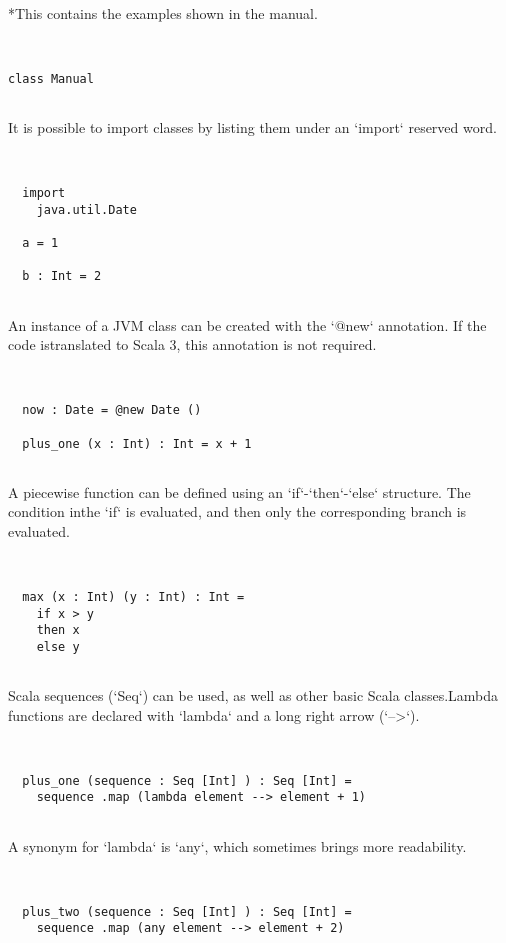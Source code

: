 \documentclass[12pt,a4paper]{article}
\begin{document}
  *This contains the examples shown in the manual.


\begin{lstlisting}


class Manual


\end{lstlisting}

It is possible to import classes by listing them under an `import` reserved word. 


\begin{lstlisting}


  import
    java.util.Date

  a = 1

  b : Int = 2


\end{lstlisting}

An instance of a JVM class can be created with the `@new` annotation. If the code istranslated to Scala 3, this annotation is not required. 


\begin{lstlisting}


  now : Date = @new Date ()

  plus_one (x : Int) : Int = x + 1


\end{lstlisting}

A piecewise function can be defined using an `if`-`then`-`else` structure. The condition inthe `if` is evaluated, and then only the corresponding branch is evaluated. 


\begin{lstlisting}


  max (x : Int) (y : Int) : Int =
    if x > y
    then x
    else y


\end{lstlisting}

Scala sequences (`Seq`) can be used, as well as other basic Scala classes.Lambda functions are declared with `lambda` and a long right arrow (`-->`). 


\begin{lstlisting}


  plus_one (sequence : Seq [Int] ) : Seq [Int] =
    sequence .map (lambda element --> element + 1)


\end{lstlisting}

A synonym for `lambda` is `any`, which sometimes brings more readability. 


\begin{lstlisting}


  plus_two (sequence : Seq [Int] ) : Seq [Int] =
    sequence .map (any element --> element + 2)


\end{lstlisting}
\end{document}
